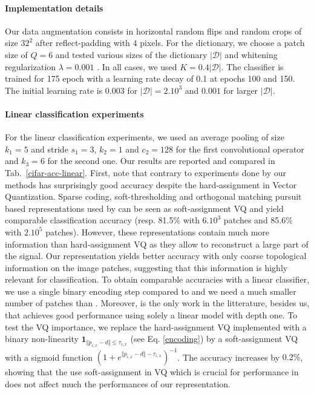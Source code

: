 \documentclass{article} %
\begin{document}
 \paragraph{Implementation details}
Our data augmentation consists in horizontal random flips and random crops of size $32^2$ after reflect-padding with $4$ pixels. 
For the dictionary, we choose a patch size of $Q=6$ and tested various sizes of the dictionary $|\mathcal{D}|$ and whitening regularization $\lambda=0.001$ . 
In all cases, we used $K=0.4 |\mathcal{D}|$.%
The classifier is trained for 175 epoch with a learning rate decay 
of 0.1 at epochs 100 and 150.
The initial learning rate is $0.003$ for $|\mathcal{D}|=2.10^3$
and $0.001$ for larger $|\mathcal{D}|$.

\paragraph{Linear classification experiments}  For the linear classification experiments, we used an average pooling of size $k_1=5$ and stride $s_1=3$, $k_2=1$ and $c_2=128$ for the first convolutional operator and $k_3=6$ for the second one.
Our results are reported and compared in Tab.~\ref{cifar-acc-linear}. First, note that contrary to experiments done by \cite{coates2011analysis} our methods has surprisingly good accuracy despite the hard-assignment in Vector Quantization.
Sparse coding, soft-thresholding and orthogonal matching pursuit based representations used by \cite{coates2011importance, recht2019imagenet} can be seen as soft-assignment VQ and yield comparable classification accuracy (resp. 81.5\% with $6.10^3$ patches and 85.6\% with $2.10^5$ patches).
However, these representations contain much more information than hard-assignment VQ as they allow to reconstruct a large part of the signal.
Our representation yields better accuracy with only coarse topological information on the image patches, suggesting that this information is highly relevant for classification.
To obtain comparable accuracies with a linear classifier, we use a single binary encoding step compared to \cite{mairal2016end} and we need a much smaller number of patches than \cite{recht2019imagenet, coates2011importance}.
Moreover, \cite{recht2019imagenet} is the only work in the litterature, besides us, that achieves good performance using solely a linear model with depth one.
To test the VQ importance, we replace the hard-assignment VQ implemented with a binary non-linearity  $\mathbf{1}_{\Vert  p_{i,x} - d\Vert \leq \tau_{i,x}}$ (see Eq. \ref{encoding}) by a soft-assignment VQ with a sigmoid function $(1 + e^{\Vert  p_{i,x} - d\Vert - \tau_{i,x}})^{-1}$.
The accuracy increases by $0.2\%$, showing that the use soft-assignment in VQ which is crucial for performance in \cite{coates2011importance} does not affect much the performances of our representation.
\end{document}
